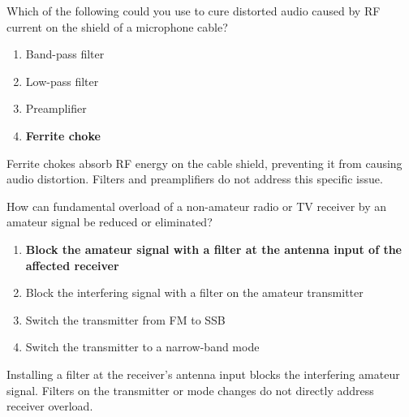 
\begin{tcolorbox}[colback=gray!10!white,colframe=black!75!black,title={T7B04}]
    Which of the following could you use to cure distorted audio caused by RF current on the shield of a microphone cable?
    \begin{enumerate}[label=\Alph*),noitemsep]
        \item Band-pass filter
        \item Low-pass filter
        \item Preamplifier
        \item \textbf{Ferrite choke}
    \end{enumerate}
\end{tcolorbox}
Ferrite chokes absorb RF energy on the cable shield, preventing it from causing audio distortion. Filters and preamplifiers do not address this specific issue.


\begin{tcolorbox}[colback=gray!10!white,colframe=black!75!black,title={T7B05}]
    How can fundamental overload of a non-amateur radio or TV receiver by an amateur signal be reduced or eliminated?
    \begin{enumerate}[label=\Alph*),noitemsep]
        \item \textbf{Block the amateur signal with a filter at the antenna input of the affected receiver}
        \item Block the interfering signal with a filter on the amateur transmitter
        \item Switch the transmitter from FM to SSB
        \item Switch the transmitter to a narrow-band mode
    \end{enumerate}
\end{tcolorbox}
Installing a filter at the receiver's antenna input blocks the interfering amateur signal. Filters on the transmitter or mode changes do not directly address receiver overload.


